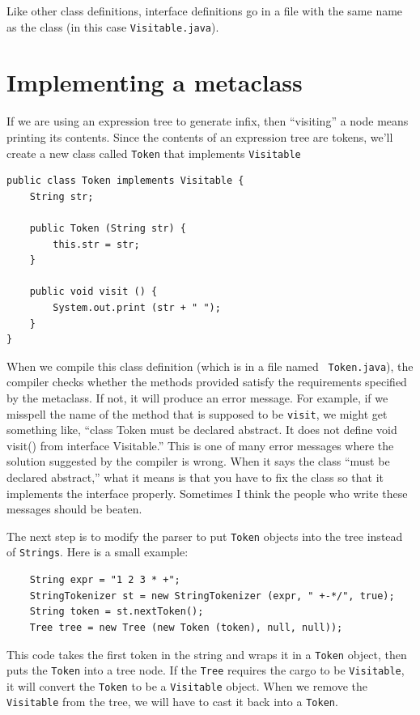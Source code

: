 \documentclass[12pt]{book}
\theoremstyle{exercise}
\begin{document}

Like other class definitions, interface definitions go in a file
with the same name as the class (in this case {\tt Visitable.java}).


\section {Implementing a metaclass}

If we are using an expression tree to generate infix, then
``visiting'' a node means printing its contents.  Since the
contents of an expression tree are tokens, we'll create a new
class called {\tt Token} that implements {\tt Visitable}

\begin{verbatim}
public class Token implements Visitable {
    String str;

    public Token (String str) {
        this.str = str;
    }

    public void visit () {
        System.out.print (str + " ");
    }
}
\end{verbatim}
%
When we compile this class definition (which is in a file named {\tt
Token.java}), the compiler checks whether the methods provided satisfy
the requirements specified by the metaclass.  If not, it will
produce an error message.  For example, if we misspell the name of the
method that is supposed to be {\tt visit}, we might get
something like, ``class Token must be declared abstract. It does not
define void visit() from interface Visitable.''  This is one of
many error messages where the solution suggested by the compiler
is wrong.  When it says the class ``must be declared abstract,''
what it means is that you have to fix the class so that it implements
the interface properly.  Sometimes I think the people who write
these messages should be beaten.

The next step is to modify the parser to put {\tt Token} objects
into the tree instead of {\tt Strings}.  Here is a small example:

\begin{verbatim}
    String expr = "1 2 3 * +";
    StringTokenizer st = new StringTokenizer (expr, " +-*/", true);
    String token = st.nextToken();
    Tree tree = new Tree (new Token (token), null, null));
\end{verbatim}
%
This code takes the first token in the string and wraps it in
a {\tt Token} object, then puts the {\tt Token} into a tree node.
If the {\tt Tree} requires the cargo to be {\tt Visitable}, it
will convert the {\tt Token} to be a {\tt Visitable} object.
When we remove the {\tt Visitable} from the tree, we will have
to cast it back into a {\tt Token}.
\end{document}
